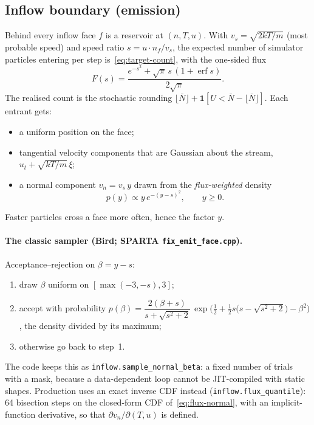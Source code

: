 \documentclass[11pt,a4paper]{article}
\numberwithin{equation}{section}
\newcommand{\ind}{\mathbf{1}}
\newcommand{\code}[1]{\texttt{#1}}
\begin{document}
\subsection{Inflow boundary (emission)}
\label{sec:primer-inflow}
Behind every inflow face $f$ is a reservoir at $(n, T, u)$.  With
$v_s = \sqrt{2kT/m}$ (most probable speed) and speed ratio $s = u\cdot n_f/v_s$, the
expected number of simulator particles entering per step is~\eqref{eq:target-count},
with the one-sided flux
\begin{equation}
\label{eq:flux-integral}
F(s) = \frac{e^{-s^2} + \sqrt\pi\, s\,(1+\operatorname{erf} s)}{2\sqrt\pi}.
\end{equation}
The realised count is the stochastic rounding
$\lfloor\bar N\rfloor + \ind[U < \bar N - \lfloor\bar N\rfloor]$.  Each entrant gets:
\begin{itemize}
\item a uniform position on the face;
\item tangential velocity components that are Gaussian about the stream,
  $u_t + \sqrt{kT/m}\,\xi$;
\item a normal component $v_n = v_s\,y$ drawn from the \emph{flux-weighted} density
  \begin{equation}
  \label{eq:flux-normal}
  p(y) \propto y\,e^{-(y - s)^2},\qquad y \ge 0.
  \end{equation}
\end{itemize}
Faster particles cross a face more often, hence the factor $y$.

\paragraph{The classic sampler (Bird; SPARTA \code{fix\_emit\_face.cpp}).}
Acceptance--rejection on $\beta = y - s$:
\begin{enumerate}
\item draw $\beta$ uniform on $[\max(-3, -s), 3]$;
\item accept with probability
  $p(\beta) = \dfrac{2(\beta+s)}{s+\sqrt{s^2+2}}\,
  \exp\!\Big(\tfrac12 + \tfrac12 s\big(s - \sqrt{s^2+2}\big) - \beta^2\Big)$,
  the density divided by its maximum;
\item otherwise go back to step~1.
\end{enumerate}
The code keeps this as \code{inflow.sample\_normal\_beta}: a fixed number of trials
with a mask, because a data-dependent loop cannot be JIT-compiled with static shapes.
Production uses an exact inverse CDF instead (\code{inflow.flux\_quantile}): 64
bisection steps on the closed-form CDF of~\eqref{eq:flux-normal}, with an
implicit-function derivative, so that $\partial v_n/\partial(T, u)$ is defined.
\end{document}
